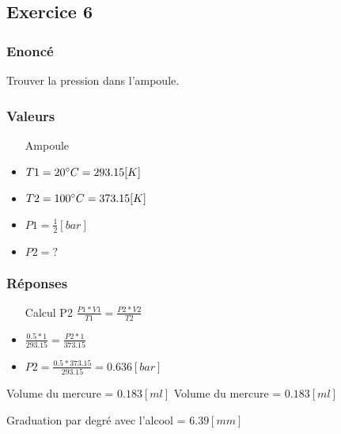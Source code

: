 
\subsection{Exercice 6}
\subsubsection{Enoncé}
Trouver la pression dans l'ampoule.
\subsubsection{Valeurs}
\begin{itemize}
    \item[Ampoule]
    \item $T1 = 20\celsius = 293.15 [K]$
    \item $T2 = 100\celsius = 373.15 [K]$  
    \item $P1 = \frac{1}{2}[bar]$
    \item $P2 = ?$
\end{itemize}

\subsubsection{Réponses}
\begin{itemize} 
    \item[Calcul P2 ] $\frac{P1*V1}{T1} = \frac{P2*V2}{T2}$
    \item $\frac{0.5 * 1}{293.15} = \frac{P2 * 1}{373.15}$
    \item $P2 = \frac{0.5*373.15}{293.15} = 0.636 [bar]$  
\end{itemize}

Volume du mercure = $0.183[ml]$
Volume du mercure = $0.183[ml]$

Graduation par degré avec l'alcool = $6.39[mm]$

